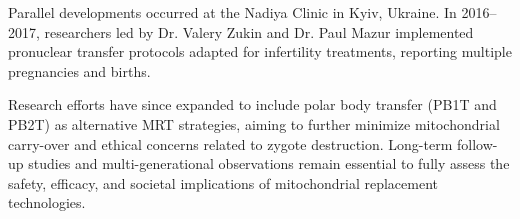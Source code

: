 \begin{historical}
Parallel developments occurred at the Nadiya Clinic in Kyiv, Ukraine. In 2016–2017, researchers led by Dr. Valery Zukin and Dr. Paul Mazur implemented pronuclear transfer protocols adapted for infertility treatments, reporting multiple pregnancies and births. 

Research efforts have since expanded to include polar body transfer (PB1T and PB2T) as alternative MRT strategies, aiming to further minimize mitochondrial carry-over and ethical concerns related to zygote destruction. Long-term follow-up studies and multi-generational observations remain essential to fully assess the safety, efficacy, and societal implications of mitochondrial replacement technologies.

\end{historical}
